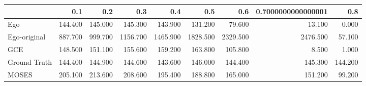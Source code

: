 \begin{tabular}{lrrrrrrrr}
\toprule
{} &     0.1 &     0.2 &      0.3 &      0.4 &      0.5 &      0.6 & 0.7000000000000001 &     0.8 \\
\midrule
Ego          & 144.400 & 145.000 &  145.300 &  143.900 &  131.200 &   79.600 &             13.100 &   0.000 \\
Ego-original & 887.700 & 999.700 & 1156.700 & 1465.900 & 1828.500 & 2329.500 &           2476.500 &  57.100 \\
GCE          & 148.500 & 151.100 &  155.600 &  159.200 &  163.800 &  105.800 &              8.500 &   1.000 \\
Ground Truth & 144.400 & 144.900 &  144.600 &  143.600 &  146.000 &  144.400 &            145.300 & 144.200 \\
MOSES        & 205.100 & 213.600 &  208.600 &  195.400 &  188.800 &  165.000 &            151.200 &  99.200 \\
\bottomrule
\end{tabular}
